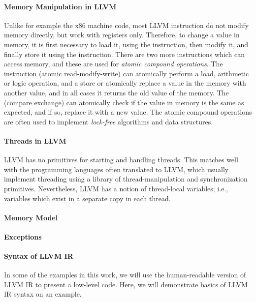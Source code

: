 \paragraph{Memory Manipulation in LLVM}
Unlike for example the x86 machine code, most LLVM instruction do not modify memory directly, but work with registers only.
Therefore, to change a value in memory, it is first necessary to load it, using the  instruction, then modify it, and finally store it using the  instruction.
There are two more instructions which can access memory, and these are used for \emph{atomic compound operations}.
The  instruction (atomic read-modify-write) can atomically perform a load, arithmetic or logic operation, and a store or atomically replace a value in the memory with another value, and in all cases it returns the old value of the memory.
The  (compare exchange) can atomically check if the value in memory is the same as expected, and if so, replace it with a new value.
The atomic compound operations are often used to implement \emph{lock-free} algorithms and data structures.

\paragraph{Threads in LLVM}

LLVM has no primitives for starting and handling threads.
This matches well with the programming languages often translated to LLVM, which usually implement threading using a library of thread-manipulation and synchronization primitives.
Nevertheless, LLVM has a notion of thread-local variables; i.e., variables which exist in a separate copy in each thread.

\paragraph{Memory Model}



\paragraph{Exceptions}

\paragraph{Syntax of LLVM IR}

In some of the examples in this work, we will use the human-readable version of LLVM IR to present a low-level code.
Here, we will demonstrate basics of LLVM IR syntax on an example.

